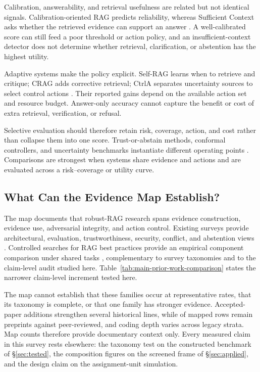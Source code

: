 Calibration, answerability, and retrieval usefulness are related but not
identical signals. Calibration-oriented RAG predicts reliability, whereas
Sufficient Context asks whether the retrieved evidence can support an answer
\citep{calibRAG2025,sufficientContext2024}. A well-calibrated score can still
feed a poor threshold or action policy, and an insufficient-context detector
does not determine whether retrieval, clarification, or abstention has the
highest utility.

Adaptive systems make the policy explicit. Self-RAG learns when to retrieve
and critique; CRAG adds corrective retrieval; CtrlA separates uncertainty
sources to select control actions
\citep{selfRAG2023,crag2024,ctrla2025}. Their reported gains depend on the
available action set and resource budget. Answer-only accuracy cannot capture
the benefit or cost of extra retrieval, verification, or refusal.

Selective evaluation should therefore retain risk, coverage, action, and cost
rather than collapse them into one score. Trust-or-abstain methods, conformal
controllers, and uncertainty benchmarks instantiate different operating
points \citep{rrag002,rrag041,rrag001}. Comparisons are strongest when systems
share evidence and actions and are evaluated across a risk--coverage or
utility curve.

\subsection{What Can the Evidence Map Establish?}

The map documents that robust-RAG research spans evidence construction,
evidence use, adversarial integrity, and action control. Existing surveys
provide architectural, evaluation, trustworthiness, security, conflict, and
abstention views
\citep{ragSurvey2024,ragEvaluationSurvey2024,trustRAGCompass2024,
securityRAGSurvey2026,xuKnowledgeConflicts2024,wenAbstentionSurvey2025}.
Controlled searches for RAG best practices provide an empirical component
comparison under shared tasks \citep{ragBestPractices2024}, complementary to
survey taxonomies and to the claim-level audit studied here.
Table~\ref{tab:main-prior-work-comparison} states the narrower claim-level
increment tested here.

The map cannot establish that these families occur at representative rates,
that its taxonomy is complete, or that one family has stronger evidence.
Accepted-paper additions strengthen several historical lines, while
\MapPreprints{} of \MapRows{} mapped rows remain preprints against
\MapPeerReviewed{} peer-reviewed, and coding depth varies across legacy strata.
Map counts therefore provide documentary context only. Every measured claim in
this survey rests elsewhere: the taxonomy test on the constructed benchmark of
\S\ref{sec:tested}, the composition figures on the screened frame of
\S\ref{sec:applied}, and the design claim on the assignment-unit simulation.
